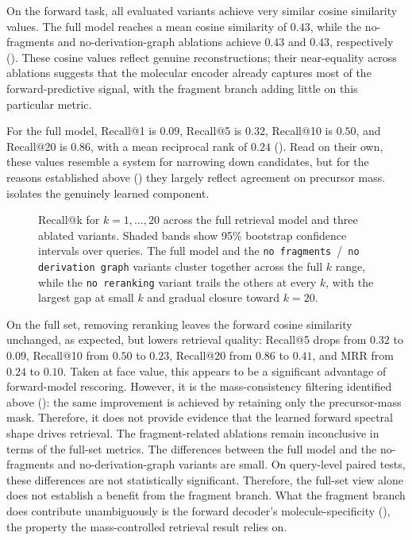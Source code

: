 On the forward task, all evaluated variants achieve very similar cosine similarity values.
The full model reaches a mean cosine similarity of $0.43$, while the no-fragments and no-derivation-graph ablations achieve $0.43$ and $0.43$, respectively ().
These cosine values reflect genuine reconstructions; their near-equality across ablations suggests that the molecular encoder already captures most of the forward-predictive signal, with the fragment branch adding little on this particular metric.

For the full model, Recall@1 is $0.09$, Recall@5 is $0.32$, Recall@10 is $0.50$, and Recall@20 is $0.86$, with a mean reciprocal rank of $0.24$ ().
Read on their own, these values resemble a system for narrowing down candidates, but for the reasons established above () they largely reflect agreement on precursor mass.
 isolates the genuinely learned component.

\begin{figure}[H]
    \centering
    \caption[Recall@k for ablation variants]{
        Recall@k for $k = 1, \ldots, 20$ across the full retrieval model and three ablated variants.
        Shaded bands show 95\% bootstrap confidence intervals over queries.
        The full model and the \texttt{no fragments}~/~\texttt{no derivation graph} variants cluster together across the full $k$ range, while the \texttt{no reranking} variant trails the others at every $k$, with the largest gap at small $k$ and gradual closure toward $k = 20$.
    }
    \label{fig:recall-at-k}
\end{figure}

On the full set, removing reranking leaves the forward cosine similarity unchanged, as expected, but lowers retrieval quality: Recall@5 drops from $0.32$ to $0.09$,
Recall@10 from $0.50$ to $0.23$, Recall@20 from $0.86$ to $0.41$, and MRR from $0.24$ to $0.10$.
Taken at face value, this appears to be a significant advantage of forward-model rescoring.
However, it is the mass-consistency filtering identified above (): the same improvement is achieved by retaining only the precursor-mass mask.
Therefore, it does not provide evidence that the learned forward spectral shape drives retrieval.
The fragment-related ablations remain inconclusive in terms of the full-set metrics.
The differences between the full model and the no-fragments and no-derivation-graph variants are small.
On query-level paired tests, these differences are not statistically significant.
Therefore, the full-set view alone does not establish a benefit from the fragment branch.
What the fragment branch does contribute unambiguously is the forward decoder's molecule-specificity (), the property the mass-controlled retrieval result relies on.

